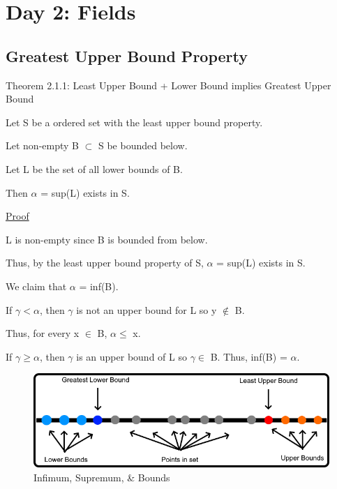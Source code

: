 \newpage
\section[Day 2: Fields]{Day 2: Fields}





\subsection{Greatest Upper Bound Property}

{ \color{red} Theorem 2.1.1: Least Upper Bound + Lower Bound implies Greatest Upper Bound }
	\begin{adjustbox}{minipage=14cm, right}
		Let S be a ordered set with the least upper bound property.

		Let non-empty B $\subset$ S be bounded below.

		Let L be the set of all lower bounds of B.

		Then $\alpha$ = sup(L) exists in S.
	\end{adjustbox}

{ \color{magenta} \underline{Proof} }

	L is non-empty since B is bounded from below.

	Thus, by the least upper bound property of S, $\alpha$ = sup(L) exists in S.

	We claim that $\alpha$ = inf(B).

	If $\gamma < \alpha$, then $\gamma$ is not an upper bound for L so y $\not \in$ B.

	Thus, for every x $\in$ B, $\alpha \leq$ x.

	If $\gamma \geq \alpha$, then $\gamma$ is an upper bound of L so $\gamma \in$ B.
	Thus, inf(B) = $\alpha$.

\begin{figure}[h]
	\centering
	\includegraphics[scale=0.45]{Images/2.1.png}
	\caption{Infimum, Supremum, \& Bounds}
\end{figure}





